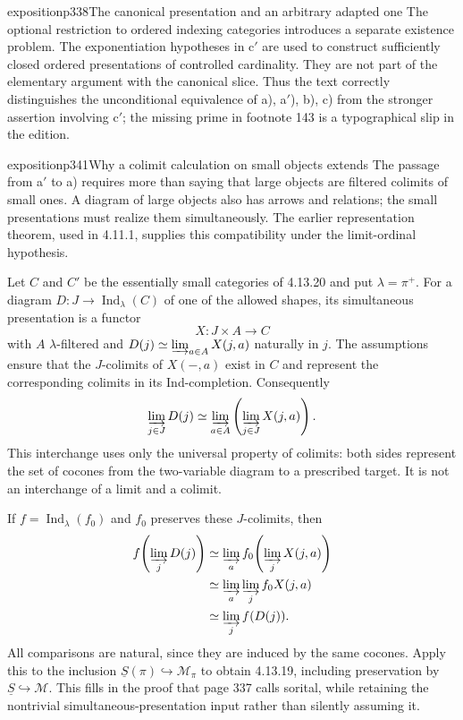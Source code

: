 \begin{dcomment}{exposition}{p338}{The canonical presentation and an arbitrary adapted one}
The optional restriction to ordered indexing categories introduces a separate existence problem. The exponentiation hypotheses in c$'$ are used to construct sufficiently closed ordered presentations of controlled cardinality. They are not part of the elementary argument with the canonical slice. Thus the text correctly distinguishes the unconditional equivalence of a), a$'$), b), c) from the stronger assertion involving c$'$; the missing prime in footnote 143 is a typographical slip in the edition.
\end{dcomment}

\begin{dcomment}{exposition}{p341}{Why a colimit calculation on small objects extends}
The passage from a$'$ to a) requires more than saying that large objects are filtered colimits of small ones. A diagram of large objects also has arrows and relations; the small presentations must realize them simultaneously. The earlier representation theorem, used in 4.11.1, supplies this compatibility under the limit-ordinal hypothesis.

Let $C$ and $C'$ be the essentially small categories of 4.13.20 and put $\lambda=\pi^+$. For a diagram $D:J\to\operatorname{Ind}_\lambda(C)$ of one of the allowed shapes, its simultaneous presentation is a functor
\[
                       X:J\times A\longrightarrow C
\]
with $A$ $\lambda$-filtered and $D(j)\simeq\varinjlim_{a\in A}X(j,a)$ naturally in $j$. The assumptions ensure that the $J$-colimits of $X(-,a)$ exist in $C$ and represent the corresponding colimits in its Ind-completion. Consequently
\[
\varinjlim_{j\in J}D(j)
 \simeq
\varinjlim_{a\in A}\left(\varinjlim_{j\in J}X(j,a)\right).
\]
This interchange uses only the universal property of colimits: both sides represent the set of cocones from the two-variable diagram to a prescribed target. It is not an interchange of a limit and a colimit.

If $f=\operatorname{Ind}_\lambda(f_0)$ and $f_0$ preserves these $J$-colimits, then
\[
\begin{aligned}
f\!\left(\varinjlim_jD(j)\right)
 &\simeq\varinjlim_a f_0\!\left(\varinjlim_jX(j,a)\right)\\
 &\simeq\varinjlim_a\varinjlim_jf_0X(j,a)\\
 &\simeq\varinjlim_j f(D(j)).
\end{aligned}
\]
All comparisons are natural, since they are induced by the same cocones. Apply this to the inclusion $\underline S(\pi)\hookrightarrow\mathcal M_\pi$ to obtain 4.13.19, including preservation by $\underline S\hookrightarrow\mathcal M$. This fills in the proof that page 337 calls sorital, while retaining the nontrivial simultaneous-presentation input rather than silently assuming it.


\end{dcomment}
